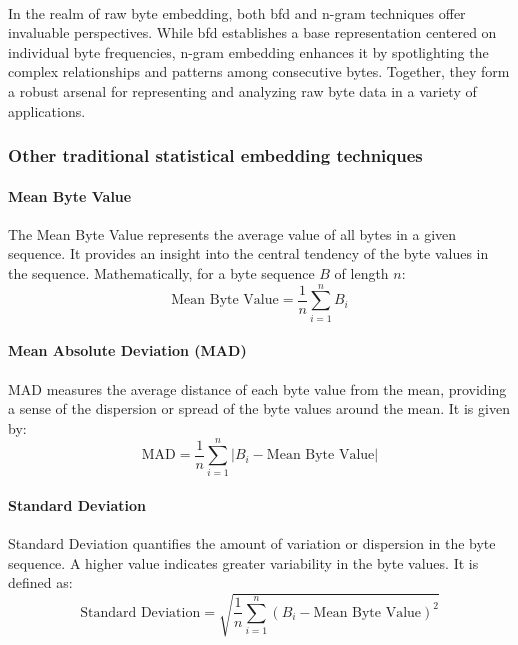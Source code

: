         \paragraph{}In the realm of raw byte embedding, both \acrshort{bfd} and n-gram techniques offer invaluable perspectives. While \acrshort{bfd} establishes a base representation centered on individual byte frequencies, n-gram embedding enhances it by spotlighting the complex relationships and patterns among consecutive bytes. Together, they form a robust arsenal for representing and analyzing raw byte data in a variety of applications.
    \subsubsection{Other traditional statistical embedding techniques}
        \paragraph{Mean Byte Value}The Mean Byte Value represents the average value of all bytes in a given sequence. It provides an insight into the central tendency of the byte values in the sequence. Mathematically, for a byte sequence \( B \) of length \( n \):
        \begin{equation}
        \text{Mean Byte Value} = \frac{1}{n} \sum_{i=1}^{n} B_i
        \label{eq:mean_byte_value}
        \end{equation}

        \paragraph{Mean Absolute Deviation (MAD)}MAD measures the average distance of each byte value from the mean, providing a sense of the dispersion or spread of the byte values around the mean. It is given by:
        \begin{equation}
        \text{MAD} = \frac{1}{n} \sum_{i=1}^{n} |B_i - \text{Mean Byte Value}|
        \label{eq:mad}
        \end{equation}

        \paragraph{Standard Deviation}Standard Deviation quantifies the amount of variation or dispersion in the byte sequence. A higher value indicates greater variability in the byte values. It is defined as:
        \begin{equation}
        \text{Standard Deviation} = \sqrt{\frac{1}{n} \sum_{i=1}^{n} (B_i - \text{Mean Byte Value})^2}
        \label{eq:standard_deviation}
        \end{equation}


